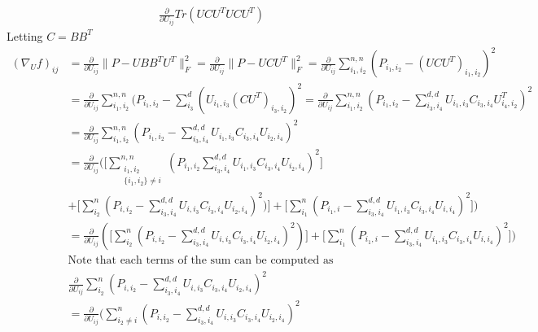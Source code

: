 \documentclass{report}
\begin{document}
    \begin{align*}
    	\frac{\partial}{\partial U_{ij}}Tr(UCU^TUCU^T)
    \end{align*}
   	Letting $ C = BB^T $
   	\begin{align*}
   		 (\nabla_{U}f)_{ij}
   		 &= \frac{\partial}{\partial U_{ij}}\|P - UBB^TU^T\|_F^2 
   		  = \frac{\partial}{\partial U_{ij}}\|P - UCU^T\|_F^2 
   		  = \frac{\partial}{\partial U_{ij}}\displaystyle \sum_{i_1,i_2}^{n,n} (P_{i_1,i_2} -  (UCU^T)_{i_1,i_2})^2 \\
   		 &= \frac{\partial}{\partial U_{ij}} \sum_{i_1,i_2}^{n,n} (P_{i_1,i_2} -    \sum_{i_3}^{d}(U_{i_1,i_3}(CU^T)_{i_3,i_2})^2 
   		  = \frac{\partial}{\partial U_{ij}} \sum_{i_1,i_2}^{n,n} (P_{i_1,i_2} - \sum_{i_3,i_4}^{d,d}U_{i_1,i_3}C_{i_3,i_4}U^T_{i_4,i_2})^2 \\
   		 &= \frac{\partial}{\partial U_{ij}} \sum_{i_1,i_2}^{n,n} (P_{i_1,i_2} - \sum_{i_3,i_4}^{d,d}U_{i_1,i_3}C_{i_3,i_4}U_{i_2,i_4})^2 \\
   		 &= \frac{\partial}{\partial U_{ij}}
   		 (\big[
	   		  \sum_{\substack{i_1,i_2 \\ \{i_1,i_2\} \neq i}}^{n,n} 
	   		  (P_{i_1,i_2} \sum_{i_3,i_4}^{d,d}U_{i_1,i_3}C_{i_3,i_4}U_{i_2,i_4})^2
  		  \big]\\
       &+ \big[
   		      \sum_{i_2}^n(P_{i,i_2} - \sum_{i_3,i_4}^{d,d}U_{i,i_3}C_{i_3,i_4}U_{i_2,i_4})^2)
   		    \big]
   		 +  \big[
   		      \sum_{i_1}^n(P_{i_1,i} - \sum_{i_3,i_4}^{d,d}U_{i_1,i_3}C_{i_3,i_4}U_{i,i_4})^2
   		    \big]) \\
   		 &=\frac{\partial}{\partial U_{ij}}(
   		  \big[
   		 \sum_{i_2}^n(P_{i,i_2} - \sum_{i_3,i_4}^{d,d}U_{i,i_3}C_{i_3,i_4}U_{i_2,i_4})^2)
   		 \big]
   		 +  \big[
   		 \sum_{i_1}^n(P_{i_1,i} - \sum_{i_3,i_4}^{d,d}U_{i_1,i_3}C_{i_3,i_4}U_{i,i_4})^2
   		 \big]) \\
   		 &\text{Note that each terms of the sum can be computed as}\\
   		 & \frac{\partial}{\partial U_{ij}}
   		 \sum_{i_2}^n
   		 (P_{i,i_2} - \sum_{i_3,i_4}^{d,d}U_{i,i_3}C_{i_3,i_4}U_{i_2,i_4})^2 \\
   		 &= \frac{\partial}{\partial U_{ij}}
   		 (\sum_{i_2 \neq i}^n
   		 (P_{i,i_2} - \sum_{i_3,i_4}^{d,d}U_{i,i_3}C_{i_3,i_4}U_{i_2,i_4})^2 

\end{align*}
\end{document}

